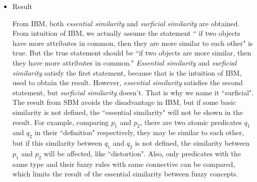 \begin{itemize}
\item Result

From IBM, both \textit{essential similarity} and \textit{surficial similarity} are obtained. From intuition of IBM, we actually assume the statement `` if two objects have more attributes in common, then they are more similar to each other" is true. But the true statement should be ``if two objects are more similar, then they have more attributes in common." 
\textit{Essential similarity} and \textit{surficial similarity} satisfy the first statement, because that is the intuition of IBM, used to obtain the result. However, \textit{essential similarity} satisfies the second statement, but \textit{surficial similarity} doesn't. That is why we name it ``surficial". The result from SBM avoids the disadvantage in IBM, but if some basic similarity is not defined, the ``essential similarity" will not be shown in the result. For example, comparing $p_1$ and $p_2$, there are two atomic predicates $q_1$ and $q_2$ in their ``definition" respectively, they may be similar to each other, but if this similarity between $q_1$ and $q_2$ is not defined, the similarity between $p_1$ and $p_2$ will be affected, like ``distortion". Also, only predicates with the same type and their fuzzy rules with same connective can be compared, which limits the result of the essential similarity between fuzzy concepts.

\end{itemize}


